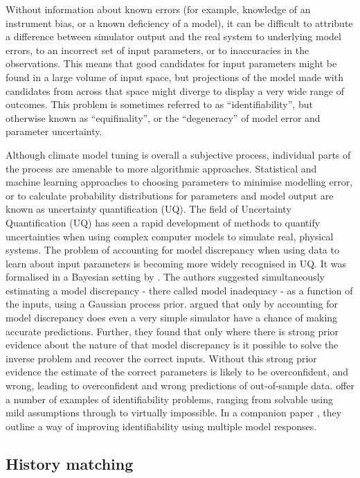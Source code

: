 \documentclass[gmd, manuscript]{copernicus}
\begin{document}
Without information about known errors (for example, knowledge of an instrument bias, or a known deficiency of a model), it can be difficult to attribute a difference between simulator output and the real system to underlying model errors, to an incorrect set of input parameters, or to inaccuracies in the observations. This means that good candidates for input parameters might be found in a large volume of input space, but projections of the model made with candidates from across that space might diverge to display a very wide range of outcomes. This problem is sometimes referred to as ``identifiability'', but otherwise known as ``equifinality'', or the ``degeneracy'' of model error and parameter uncertainty. 

Although climate model tuning is overall a subjective process, individual parts of the process are amenable to more algorithmic approaches. Statistical and machine learning approaches to choosing parameters to minimise modelling error, or to calculate probability distributions for parameters and model output are known as uncertainty quantification (UQ). The field of Uncertainty Quantification (UQ) has seen a rapid development of methods to quantify uncertainties when using complex computer models to simulate real, physical systems. The problem of accounting for model discrepancy when using data to learn about input parameters is becoming more widely recognised in UQ. It was formalised in a Bayesian setting by \cite{kennedy2001bayesian}. The authors suggested simultaneously estimating a model discrepancy  - there called model inadequacy - as a function of the inputs, using a Gaussian process prior. \cite{brynjarsdottir2014learning} argued that only by accounting for model discrepancy does even a very simple simulator have a chance of making accurate predictions. Further, they found that only where there is strong prior evidence about the nature of that model discrepancy is it possible to solve the inverse problem and recover the correct inputs. Without this strong prior evidence the estimate of the correct parameters is likely to be overconfident, and wrong, leading to overconfident and wrong predictions of out-of-sample data. \cite{arendt2012quantification} offer a number of examples of identifiability problems, ranging from solvable using mild assumptions through to virtually impossible. In a companion paper \citep{arendt2012improving}, they outline a way of improving identifiability using multiple model responses. 

\subsection{History matching}
\end{document}
